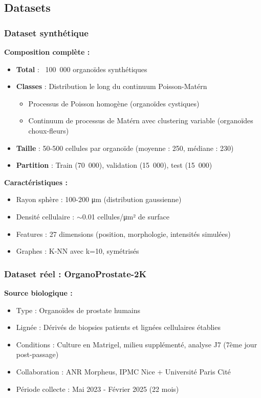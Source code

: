 \subsection{Datasets}

\subsubsection{Dataset synthétique}

\textbf{Composition complète :}
\begin{itemize}
    \item \textbf{Total} : ~100~000 organoïdes synthétiques
    \item \textbf{Classes} : Distribution le long du continuum Poisson-Matérn
    \begin{itemize}
        \item Processus de Poisson homogène (organoïdes cystiques)
        \item Continuum de processus de Matérn avec clustering variable (organoïdes choux-fleurs)
    \end{itemize}
    \item \textbf{Taille} : 50-500 cellules par organoïde (moyenne : 250, médiane : 230)
    \item \textbf{Partition} : Train (70~000), validation (15~000), test (15~000)
\end{itemize}

\textbf{Caractéristiques :}
\begin{itemize}
    \item Rayon sphère : 100-200 μm (distribution gaussienne)
    \item Densité cellulaire : $\sim$0.01 cellules/μm² de surface
    \item Features : 27 dimensions (position, morphologie, intensités simulées)
    \item Graphes : K-NN avec k=10, symétrisés
\end{itemize}

\subsubsection{Dataset réel : OrganoProstate-2K}

\textbf{Source biologique :}
\begin{itemize}
    \item Type : Organoïdes de prostate humains
    \item Lignée : Dérivés de biopsies patients et lignées cellulaires établies
    \item Conditions : Culture en Matrigel, milieu supplémenté, analyse J7 (7ème jour post-passage)
    \item Collaboration : ANR Morpheus, IPMC Nice + Université Paris Cité
    \item Période collecte : Mai 2023 - Février 2025 (22 mois)
\end{itemize}

